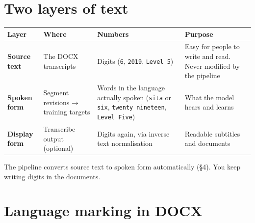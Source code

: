 \documentclass[11pt]{article}
\begin{document}
{\small\setlength{\parskip}{0pt}\setcounter{tocdepth}{1}\tableofcontents}
\bigskip
\hypertarget{two-layers-of-text}{%
\section{Two layers of text}\label{two-layers-of-text}}

\begin{longtable}[]{@{}>{\raggedright\arraybackslash}p{}>{\raggedright\arraybackslash}p{}>{\raggedright\arraybackslash}p{}>{\raggedright\arraybackslash}p{}@{}}
\toprule\noalign{}
Layer & Where & Numbers & Purpose \\
\midrule\noalign{}
\endhead
\bottomrule\noalign{}
\endlastfoot
\textbf{Source text} & The DOCX transcripts & Digits (\texttt{6}, \texttt{2019}, \texttt{Level 5}) & Easy for people to write and read. Never modified by the pipeline \\
\textbf{Spoken form} & Segment revisions → training targets & Words in the language actually spoken (\texttt{sita} or \texttt{six}, \texttt{twenty nineteen}, \texttt{Level Five}) & What the model hears and learns \\
\textbf{Display form} & Transcribe output (optional) & Digits again, via inverse text normalisation & Readable subtitles and documents \\
\end{longtable}

The pipeline converts source text to spoken form automatically (§4). You keep writing digits in the documents.

\hypertarget{language-marking-in-docx}{%
\section{Language marking in DOCX}\label{language-marking-in-docx}}
\end{document}
